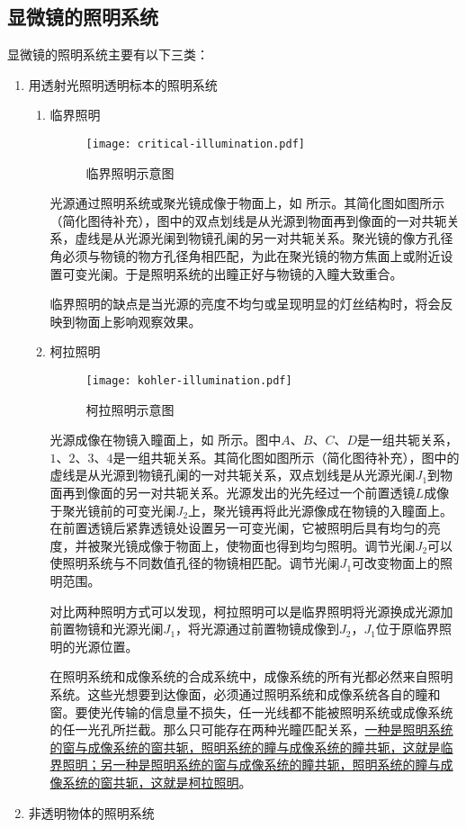 \documentclass[cn,10pt,chinesefont=founder,math=newtx,cite=super,twoside]{elegantbook}
\begin{document}
\subsection{显微镜的照明系统}
显微镜的照明系统主要有以下三类：
\begin{enumerate}
	\item 用透射光照明透明标本的照明系统
	\begin{enumerate}
		\item 临界照明
		
		\begin{figure}[htbp]
			\centering
			\texttt{[image: critical-illumination.pdf]}
			\caption{临界照明示意图}
			\label{fig:critical-illumination}
		\end{figure}
		
		光源通过照明系统或聚光镜成像于物面上，如 所示。其简化图如图所示（简化图待补充），图中的双点划线是从光源到物面再到像面的一对共轭关系，虚线是从光源光阑到物镜孔阑的另一对共轭关系。聚光镜的像方孔径角必须与物镜的物方孔径角相匹配，为此在聚光镜的物方焦面上或附近设置可变光阑。于是照明系统的出瞳正好与物镜的入瞳大致重合。
		\begin{note}
			临界照明的缺点是当光源的亮度不均匀或呈现明显的灯丝结构时，将会反映到物面上影响观察效果。
		\end{note}
		\item 柯拉照明
		
		\begin{figure}[htbp]
			\centering
			\texttt{[image: kohler-illumination.pdf]}
			\caption{柯拉照明示意图}
			\label{fig:kohler-illumination}
		\end{figure}
		
		光源成像在物镜入瞳面上，如 所示。图中$A$、$B$、$C$、$D$是一组共轭关系，$1$、$2$、$3$、$4$是一组共轭关系。其简化图如图所示（简化图待补充），图中的虚线是从光源到物镜孔阑的一对共轭关系，双点划线是从光源光阑$J_1$到物面再到像面的另一对共轭关系。光源发出的光先经过一个前置透镜$L$成像于聚光镜前的可变光阑$J_2$上，聚光镜再将此光源像成在物镜的入瞳面上。在前置透镜后紧靠透镜处设置另一可变光阑，它被照明后具有均匀的亮度，并被聚光镜成像于物面上，使物面也得到均匀照明。调节光阑$J_2$可以使照明系统与不同数值孔径的物镜相匹配。调节光阑$J_1$可改变物面上的照明范围。
		\begin{note}
			对比两种照明方式可以发现，柯拉照明可以是临界照明将光源换成光源加前置物镜和光源光阑$J_1$，将光源通过前置物镜成像到$J_2$，$J_1$位于原临界照明的光源位置。
		\end{note}
		\begin{property}
			在照明系统和成像系统的合成系统中，成像系统的所有光都必然来自照明系统。这些光想要到达像面，必须通过照明系统和成像系统各自的瞳和窗。要使光传输的信息量不损失，任一光线都不能被照明系统或成像系统的任一光孔所拦截。那么只可能存在两种光瞳匹配关系，\uline{一种是照明系统的窗与成像系统的窗共轭，照明系统的瞳与成像系统的瞳共轭，这就是临界照明；另一种是照明系统的窗与成像系统的瞳共轭，照明系统的瞳与成像系统的窗共轭，这就是柯拉照明}。
		\end{property}
	\end{enumerate}
	\item 非透明物体的照明系统
	

\end{enumerate}
\end{document}
